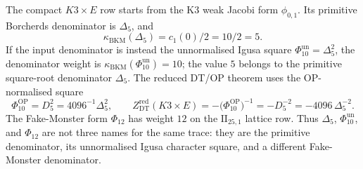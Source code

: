 \begin{remark}
\label{rem:phiutp-delta5-phi10-phi12-split}
The compact \(K3\times E\) row starts from the K3 weak Jacobi form
\(\phi_{0,1}\). Its primitive Borcherds denominator is
\(\Delta_5\), and
\[
 \kappa_{\mathrm{BKM}}(\Delta_5)=c_1(0)/2=10/2=5.
\]
If the input denominator is instead the unnormalised Igusa square
\(\Phi_{10}^{\mathrm{un}}=\Delta_5^2\), the denominator weight is
\(\kappa_{\mathrm{BKM}}(\Phi_{10}^{\mathrm{un}})=10\); the value \(5\)
belongs to the primitive square-root denominator \(\Delta_5\).
The reduced DT/OP theorem uses the OP-normalised square
\[
 \Phi_{10}^{\mathrm{OP}}=D_5^2=4096^{-1}\Delta_5^2,\qquad
 Z^{\mathrm{red}}_{\mathrm{DT}}(K3\times E)
 =-\bigl(\Phi_{10}^{\mathrm{OP}}\bigr)^{-1}
 =-D_5^{-2}
 =-4096\,\Delta_5^{-2}.
\]
The Fake-Monster form \(\Phi_{12}\) has weight \(12\) on the
\(\mathrm{II}_{25,1}\) lattice row. Thus \(\Delta_5\),
\(\Phi_{10}^{\mathrm{un}}\), and \(\Phi_{12}\) are not three names for
the same trace: they are the primitive denominator, its unnormalised
Igusa character square, and a different
Fake-Monster denominator.
\end{remark}

